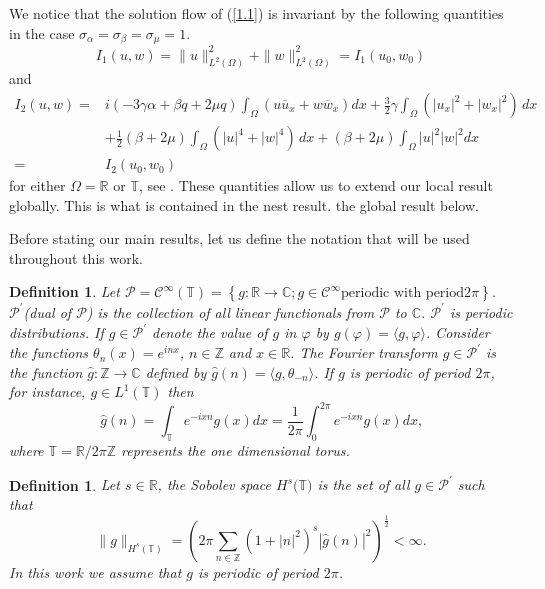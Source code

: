 \documentclass[reqno]{amsart}
\newtheorem{definition}[theorem]{Definition}
\numberwithin{equation}{section}
\begin{document}
We notice that the solution flow of (\ref{1.1}) is invariant by
the following quantities in the case $\sigma_{\alpha}
=\sigma_{\beta}=\sigma_{\mu}=1$.
\begin{equation}\label{1.9}
I_{1}(u,w)=\|u\| _{L^{2}\left(  \Omega\right)  }^{2}+\| w\| _{L^{2}\left(  \Omega\right)  }^{2}=I_{1}(u_{0},w_{0})
\end{equation}
and
\begin{equation}\label{1.10}
\begin{split}
I_{2}(u,w)=&i(-3\gamma\alpha\!+\!\beta q\!+\!2\mu q)
\int_{\Omega}(u\overline{u}_{x}+w\overline{w}_{x})dx
+\frac{3}{2}\gamma\int_{\Omega}(|u_{x}|^2+|w_{x}|^2)\,dx\\
&+\frac{1}{2}\left(\beta+2\mu\right)\int_{\Omega}(|u|^4+|w|^4)\,dx
+\left(\beta+2\mu\right)  \int_{\Omega}  |u|^{2} | w| ^{2}dx\\
=&I_{2}(u_{0},w_{0})\,
\end{split}
\end{equation}
for either $\Omega=\mathbb{R}$ or $\mathbb{T}$, see . These
quantities allow us to extend our local result globally. This is
what is contained in the nest result.
 the global result below.

Before stating our main results, let us define the notation that
will be used throughout this work.

\begin{definition}
Let $\mathcal{P}=\mathcal{C}^{\infty}\left(  \mathbb{T}\right)
=\left\{ g:\mathbb{R}\rightarrow\mathbb{C};\text{
}g\in\mathcal{C}^{\infty}\text{periodic with period} 2\pi\right\}
$. $\mathcal{P}^{\prime}$(dual of $\mathcal{P}$) is the collection
of all linear functionals  from $\mathcal{P}$ to $\mathbb{C}$.
$\mathcal{P}^{\prime}$ is periodic distributions. If
$g\in\mathcal{P}^{\prime}$ denote the value of  $g$ in $\varphi$
by $g\left( \varphi\right) =\langle g,\varphi\rangle$. Consider
the functions  $\theta_{n}\left( x\right) =e^{inx}$,
$n\in\mathbb{Z}$ and $x\in\mathbb{R}$. The Fourier transform
$g\in\mathcal{P}^{\prime}$ is the function
$\widehat{g}:\mathbb{Z}\rightarrow\mathbb{C}$ defined by
$\widehat{g}\left( n\right)  =\langle g,\theta_{-n}\rangle$. If
$g$ is periodic of period $2\pi$, for instance, $g\in L^{1}\left(
\mathbb{T}\right)  $ then
\[
\widehat{g}(n)=\int_{\mathbb{T}}e^{-ixn}g(x)dx=\frac{1}{2\pi}\int
\nolimits_{0}^{2\pi}e^{-ixn}g(x)dx\text{,}\]
where $\mathbb{T=R}/2\pi\mathbb{Z}$ represents the one dimensional
torus.
\end{definition}

\begin{definition}
Let $s\in\mathbb{R}$, the Sobolev space $H^{s}(\mathbb{T)}$
is the set of all $g\in\mathcal{P}^{\prime}$ such that
\[
\| g\| _{H^{s}(\mathbb{T})}=\left(2\pi\sum\limits_{n\in \mathbb{Z}}(1+| n|
^{2})^{s}| \widehat{g}(n)| ^{2}\right)  ^{\frac{1}{2}}<\infty.
\]
In this work we assume that $g$ is periodic of period $2\pi$.
\end{definition}
\end{document}
